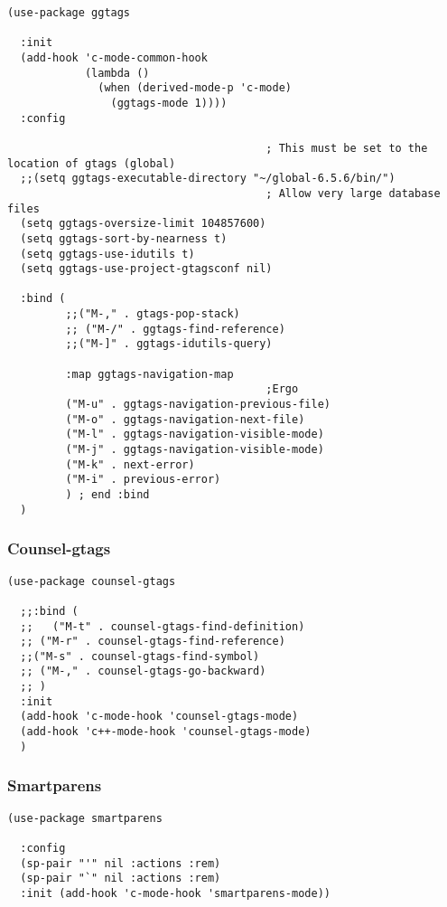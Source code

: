 \documentclass[12pt]{article}
\begin{document}
\begin{verbatim}
(use-package ggtags

  :init
  (add-hook 'c-mode-common-hook
            (lambda ()
              (when (derived-mode-p 'c-mode)
                (ggtags-mode 1))))
  :config

                                        ; This must be set to the location of gtags (global)
  ;;(setq ggtags-executable-directory "~/global-6.5.6/bin/")
                                        ; Allow very large database files
  (setq ggtags-oversize-limit 104857600)
  (setq ggtags-sort-by-nearness t)
  (setq ggtags-use-idutils t)
  (setq ggtags-use-project-gtagsconf nil)

  :bind (
         ;;("M-," . gtags-pop-stack)
         ;; ("M-/" . ggtags-find-reference)
         ;;("M-]" . ggtags-idutils-query)

         :map ggtags-navigation-map
                                        ;Ergo
         ("M-u" . ggtags-navigation-previous-file)
         ("M-o" . ggtags-navigation-next-file)
         ("M-l" . ggtags-navigation-visible-mode)
         ("M-j" . ggtags-navigation-visible-mode)
         ("M-k" . next-error)
         ("M-i" . previous-error)
         ) ; end :bind
  )

\end{verbatim}

\subsubsection{Counsel-gtags}
\label{sec:orgfc4faa3}

\begin{verbatim}
(use-package counsel-gtags

  ;;:bind (
  ;;   ("M-t" . counsel-gtags-find-definition)
  ;; ("M-r" . counsel-gtags-find-reference)
  ;;("M-s" . counsel-gtags-find-symbol)
  ;; ("M-," . counsel-gtags-go-backward)
  ;; )
  :init 
  (add-hook 'c-mode-hook 'counsel-gtags-mode)
  (add-hook 'c++-mode-hook 'counsel-gtags-mode)
  )

\end{verbatim}

\subsubsection{Smartparens}
\label{sec:org863c440}

\begin{verbatim}
(use-package smartparens

  :config
  (sp-pair "'" nil :actions :rem)
  (sp-pair "`" nil :actions :rem)
  :init (add-hook 'c-mode-hook 'smartparens-mode))
\end{verbatim}
\end{document}
